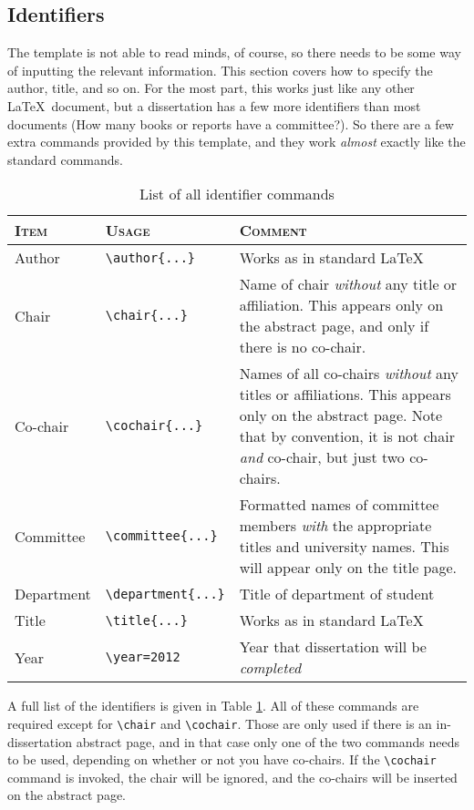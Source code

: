 \subsection{Identifiers}
The template is not able to read minds, of course, so there needs to be
some way of inputting the relevant information.  This section covers how
to specify the author, title, and so on.  For the most part, this works
just like any other \LaTeX~document, but a dissertation has a few more
identifiers than most documents (How many books or reports have a
committee?).  So there are a few extra commands provided by this
template, and they work \emph{almost} exactly like the standard
commands.

\begin{table}
 \caption{ \label{tab:identifiers}
  List of all identifier commands}
 \centering
 \small
 \begin{tabular}{l @{\hspace{16pt}} l @{\hspace{16pt}} p{6cm}}
  \hline \hline
  \textsc{Item} & \textsc{Usage} & \textsc{Comment} \\
  \hline
  Author      & \verb|\author{...}|
   & Works as in standard \LaTeX \\
  Chair       & \verb|\chair{...}|
   & Name of chair \emph{without} any title or affiliation.  This
     appears only on the abstract page, and only if there is no
     co-chair. \\
  Co-chair    & \verb|\cochair{...}|
   & Names of all co-chairs \emph{without} any titles or
     affiliations.  This appears only on the abstract page.  Note
     that by convention, it is not chair \emph{and} co-chair, but
     just two co-chairs. \\
  Committee   & \verb|\committee{...}|
   & Formatted names of committee members \emph{with} the
     appropriate titles and university names.  This will appear
     only on the title page. \\
  Department  & \verb|\department{...}|
   & Title of department of student \\
  Title       & \verb|\title{...}|
   & Works as in standard \LaTeX \\
  Year        & \verb|\year=2012|
   & Year that dissertation will be \emph{completed} \\
  \hline \hline
 \end{tabular}
\end{table}

A full list of the identifiers is given in Table \ref{tab:identifiers}.
All of these commands are required except for \verb|\chair| and
\verb|\cochair|.  Those are only used if there is an in-dissertation
abstract page, and in that case only one of the two commands needs to
be used, depending on whether or not you have co-chairs.  If the
\verb|\cochair| command is invoked, the chair will be ignored, and the
co-chairs will be inserted on the abstract page.

